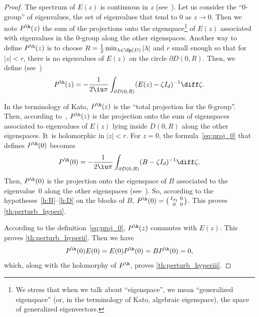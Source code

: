 \begin{proof}
The spectrum of $E(z)$ is continuous in $z$ (see~\cite[Ch.\,II, \S1.2]{kato_1995}). Let us consider the ``$0$-group'' of eigenvalues, \ie the set of eigenvalues that tend to $0$ as $z\to 0$. Then we note $P^\h(z)$ the sum of the projections onto the eigenspace\footnote{We stress that when we talk about ``eigenspace'', we mean ``generalized eigenspace'' (or, in the terminology of Kato, algebraic eigenspace), \ie the space of generalized eigenvectors.} of $E(z)$ associated with eigenvalues in the $0$-group along the other eigenspaces. Another way to define $P^\h(z)$ is to choose $R=\frac12 \min_{\lambda\in\Sp(D)} |\lambda|$ and $r$ small enough so that for $|z|<r$, there is no eigenvalues of $E(z)$ on the circle $\partial D(0,R)$. Then, we define (see~\cite[Ch.\,II, Eq.\,(1.16)]{kato_1995})
\begin{equation}\label{eq:proj_0}
P^\h(z) = -\frac1{2\iu\pi}\int_{\partial D(0,R)} (E(z)-\zeta I_d)^{-1}\diff \zeta.
\end{equation}

In the terminology of Kato, $P^\h(z)$ is the ``total projection for the $0$-group''. Then, according to~\cite[Ch.\,II, \S1.4]{kato_1995}, $P^\h(z)$ is the projection onto the sum of eigenspaces associated to eigenvalues of $E(z)$ lying inside $D(0,R)$ along the other eigenspaces. It~is holomorphic in $|z|<r$. For $z=0$, the formula~\eqref{eq:proj_0} that defines $P^\h(0)$ becomes
\[
P^\h(0) = -\frac1{2\iu\pi}\int_{\partial D(0,R)} (B-\zeta I_d)^{-1}\diff \zeta.
\]
Then, $P^\h(0)$ is the projection onto the eigenspace of $B$ associated to the eigenvalue~$0$ along the other eigenspaces (see~\cite[Ch.\,II, \S1.4]{kato_1995}). So, according to the hypotheses~\eqref{h:B}--\eqref{h:D} on the blocks of $B$, $P^\h(0) = \big(\begin{smallmatrix}I_{d_1}&0\\0&0 \end{smallmatrix} \big)$. This proves \eqref{th:perturb_hyperi}.

According to the definition~\eqref{eq:proj_0}, $P^\h(z)$ commutes with $E(z)$. This proves \eqref{th:perturb_hyperii}. Then we have
\[
P^\h(0)E(0) = E(0)P^\h(0) = BP^\h(0) = 0,
\]
which, along with the holomorphy of $P^\h$, proves \eqref{th:perturb_hyperiii}.
\end{proof}

